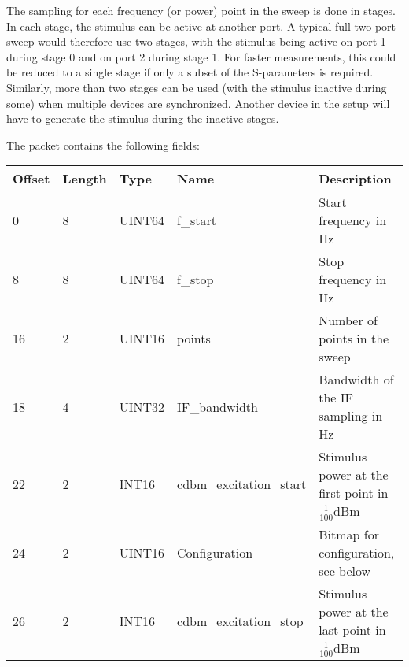 \documentclass[a4paper,11pt]{article}
\begin{document}
The sampling for each frequency (or power) point in the sweep is done in stages. In each stage, the stimulus can be active at another port. A typical full two-port sweep would therefore use two stages, with the stimulus being active on port 1 during stage 0 and on port 2 during stage 1. For faster measurements, this could be reduced to a single stage if only a subset of the S-parameters is required. Similarly, more than two stages can be used (with the stimulus inactive during some) when multiple devices are synchronized. Another device in the setup will have to generate the stimulus during the inactive stages.


The packet contains the following fields:
\begin{ThreePartTable}
\setlength\tabcolsep{3pt}

\begin{longtable}{p{} |  p{}  |  p{}| p{} | p{}}
\toprule
\textbf{Offset} &\textbf{Length} &\textbf{Type} & \textbf{Name} &\textbf{Description} \\ 
\hline
\endhead
\midrule[\heavyrulewidth]
\endfoot  
\midrule[\heavyrulewidth]
\endlastfoot

0 & 8 & UINT64 & f\_start & Start frequency in Hz \\
8 & 8 & UINT64 & f\_stop & Stop frequency in Hz \\
16 & 2 & UINT16 & points & Number of points in the sweep \\
18 & 4 & UINT32 & IF\_bandwidth & Bandwidth of the IF sampling in Hz \\
22 & 2 &  INT16 &cdbm\_excitation\_start &  Stimulus power at the first point in $\frac{1}{100}$dBm \\
24 & 2 & UINT16 & Configuration & Bitmap for configuration, see below \\
26 & 2 &  INT16 &cdbm\_excitation\_stop & Stimulus power at the last point in $\frac{1}{100}$dBm \\
\end{longtable}   
\end{ThreePartTable}
\end{document}

